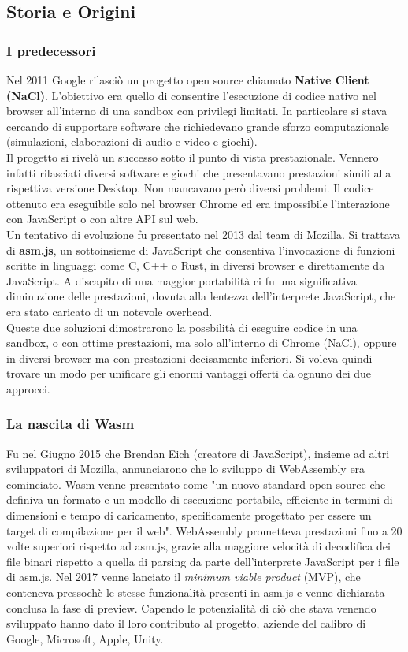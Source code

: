 \subsection{Storia e Origini}
\subsubsection{I predecessori}
Nel 2011 Google rilasciò un progetto open source chiamato \textbf{Native Client (NaCl)}.
L'obiettivo era quello di consentire l'esecuzione di codice nativo nel browser all'interno di una sandbox con privilegi limitati.
In particolare si stava cercando di supportare software che richiedevano grande sforzo computazionale (simulazioni, elaborazioni di audio e video e giochi).
\\Il progetto si rivelò un successo sotto il punto di vista prestazionale. Vennero infatti rilasciati diversi software e giochi che presentavano prestazioni simili alla rispettiva versione Desktop.
Non mancavano però diversi problemi. Il codice ottenuto era eseguibile solo nel browser Chrome ed era impossibile l'interazione con JavaScript o con altre API sul web.
\\Un tentativo di evoluzione fu presentato nel 2013 dal team di Mozilla. Si trattava di \textbf{asm.js}, un sottoinsieme di JavaScript che consentiva l'invocazione di funzioni scritte in linguaggi come C, C++ o Rust, in diversi browser e direttamente da JavaScript.
A discapito di una maggior portabilità ci fu una significativa diminuzione delle prestazioni, dovuta alla lentezza dell'interprete JavaScript, che era stato caricato di un notevole overhead.
\\Queste due soluzioni dimostrarono la possbilità di eseguire codice in una sandbox, o con ottime prestazioni, ma solo all'interno di Chrome (NaCl), oppure in diversi browser ma con prestazioni decisamente inferiori.
Si voleva quindi trovare un modo per unificare gli enormi vantaggi offerti da ognuno dei due approcci.\cite*{wasmBook}
\subsubsection{La nascita di Wasm}
Fu nel Giugno 2015 che Brendan Eich (creatore di JavaScript), insieme ad altri sviluppatori di Mozilla, annunciarono che lo sviluppo di WebAssembly era cominciato.\cite*{asmjsToWasm}
Wasm venne presentato come "un nuovo standard open source che definiva un formato e un modello di esecuzione portabile, efficiente in termini di dimensioni e tempo di caricamento, specificamente progettato per essere un target di compilazione per il web".
WebAssembly prometteva prestazioni fino a 20 volte superiori rispetto ad asm.js, grazie alla maggiore velocità di decodifica dei file binari rispetto a quella di parsing da parte dell'interprete JavaScript per i file di asm.js.
Nel 2017 venne lanciato il \emph{minimum viable product} (MVP), che conteneva pressochè le stesse funzionalità presenti in asm.js e venne dichiarata conclusa la fase di preview.
Capendo le potenzialità di ciò che stava venendo sviluppato hanno dato il loro contributo al progetto, aziende del calibro di Google, Microsoft, Apple, Unity.

